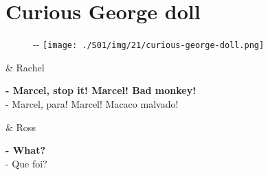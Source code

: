 \hypertarget{curious-george-doll}{%
\section{Curious George doll}\label{curious-george-doll}}

\begin{figure}[!ht]
  \begin{adjustwidth}{-\oddsidemargin-1in}{-\rightmargin}
    \centering
    \texttt{[image: ./S01/img/21/curious-george-doll.png]}
  \end{adjustwidth}
\end{figure}

\begin{tcolorbox}[enhanced,center upper,
    drop fuzzy shadow southeast, boxrule=0.3pt,
    lower separated=false, breakable,
    colframe=black!30!dialogoBorder,colback=white]
\begin{minipage}[c]{0.16\linewidth}
   & \centering \scriptsize{Rachel}
\end{minipage}
\hfill
\begin{minipage}[c]{0.8\linewidth}
  \textbf{- Marcel, stop it! Marcel! Bad monkey!}\\
  - Marcel, para! Marcel! Macaco malvado!
\end{minipage}

\medskip
\begin{minipage}[c]{0.16\linewidth}
   & \centering \scriptsize{Ross}
\end{minipage}
\hfill
\begin{minipage}[c]{0.8\linewidth}
  \textbf{- What?}\\
  - Que foi?
\end{minipage}


\end{tcolorbox}
